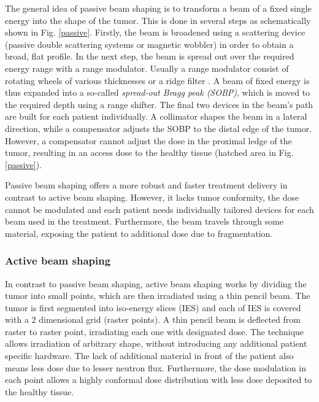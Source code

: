 The general idea of passive beam shaping is to transform a beam of a fixed single energy into the shape of the tumor. This is done in several steps as schematically shown in Fig. \ref{passive}. Firstly, the beam is broadened using a scattering device (passive double scattering systems or magnetic wobbler)
in order to obtain a broad, flat profile. In the next step, the beam is spread out over the required energy range with a range modulator. Usually a range modulator consist of rotating wheels of various thicknesses or a ridge filter \cite{Chu1993}. A beam of fixed energy is thus expanded into a so-called \textit{spread-out Bragg peak (SOBP)}, which is moved to the required depth using a range shifter. The final two devices in the beam's path are built for each patient individually. A collimator shapes the beam in a lateral direction, while a compensator adjusts the SOBP to the distal edge of the tumor. However, a compensator cannot adjust the dose in the proximal ledge of the tumor, resulting in an access dose to the healthy tissue (hatched area in Fig. \ref{passive}).
 
Passive beam shaping offers a more robust and faster treatment delivery in contrast to active beam shaping. However, it lacks tumor conformity, the dose cannot be modulated and each patient needs individually tailored devices for each beam used in the treatment.
 Furthermore, the beam travels through some material, exposing the patient to additional dose due to fragmentation.

\subsubsection{Active beam shaping}
\label{Sec::Active}

In contrast to passive beam shaping, active beam shaping works by dividing the tumor into small points, which are then irradiated using a thin pencil beam. The tumor is first segmented into iso-energy slices (IES) and each of IES
is covered with a 2 dimensional grid (raster points). A thin pencil beam is deflected from raster to raster point, irradiating each one with designated dose. The technique allows irradiation of arbitrary shape, without introducing any additional patient specific 
hardware. The lack of additional material in front of the patient also means less dose due to lesser neutron flux. Furthermore, the dose modulation in each point allows a highly conformal dose distribution with less dose deposited to the healthy tissue.

 \newpage
 
